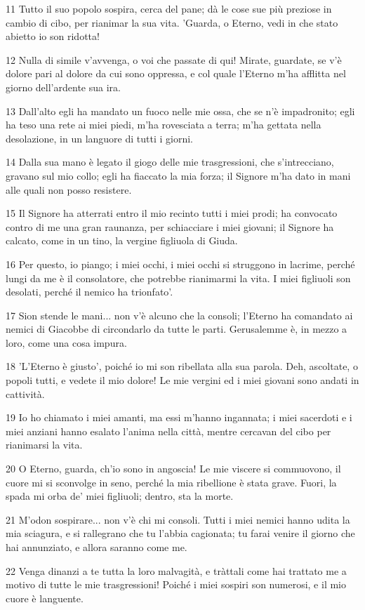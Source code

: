 \par 11 Tutto il suo popolo sospira, cerca del pane; dà le cose sue più preziose in cambio di cibo, per rianimar la sua vita. 'Guarda, o Eterno, vedi in che stato abietto io son ridotta!
\par 12 Nulla di simile v'avvenga, o voi che passate di qui! Mirate, guardate, se v'è dolore pari al dolore da cui sono oppressa, e col quale l'Eterno m'ha afflitta nel giorno dell'ardente sua ira.
\par 13 Dall'alto egli ha mandato un fuoco nelle mie ossa, che se n'è impadronito; egli ha teso una rete ai miei piedi, m'ha rovesciata a terra; m'ha gettata nella desolazione, in un languore di tutti i giorni.
\par 14 Dalla sua mano è legato il giogo delle mie trasgressioni, che s'intrecciano, gravano sul mio collo; egli ha fiaccato la mia forza; il Signore m'ha dato in mani alle quali non posso resistere.
\par 15 Il Signore ha atterrati entro il mio recinto tutti i miei prodi; ha convocato contro di me una gran raunanza, per schiacciare i miei giovani; il Signore ha calcato, come in un tino, la vergine figliuola di Giuda.
\par 16 Per questo, io piango; i miei occhi, i miei occhi si struggono in lacrime, perché lungi da me è il consolatore, che potrebbe rianimarmi la vita. I miei figliuoli son desolati, perché il nemico ha trionfato'.
\par 17 Sion stende le mani... non v'è alcuno che la consoli; l'Eterno ha comandato ai nemici di Giacobbe di circondarlo da tutte le parti. Gerusalemme è, in mezzo a loro, come una cosa impura.
\par 18 'L'Eterno è giusto', poiché io mi son ribellata alla sua parola. Deh, ascoltate, o popoli tutti, e vedete il mio dolore! Le mie vergini ed i miei giovani sono andati in cattività.
\par 19 Io ho chiamato i miei amanti, ma essi m'hanno ingannata; i miei sacerdoti e i miei anziani hanno esalato l'anima nella città, mentre cercavan del cibo per rianimarsi la vita.
\par 20 O Eterno, guarda, ch'io sono in angoscia! Le mie viscere si commuovono, il cuore mi si sconvolge in seno, perché la mia ribellione è stata grave. Fuori, la spada mi orba de' miei figliuoli; dentro, sta la morte.
\par 21 M'odon sospirare... non v'è chi mi consoli. Tutti i miei nemici hanno udita la mia sciagura, e si rallegrano che tu l'abbia cagionata; tu farai venire il giorno che hai annunziato, e allora saranno come me.
\par 22 Venga dinanzi a te tutta la loro malvagità, e tràttali come hai trattato me a motivo di tutte le mie trasgressioni! Poiché i miei sospiri son numerosi, e il mio cuore è languente.

